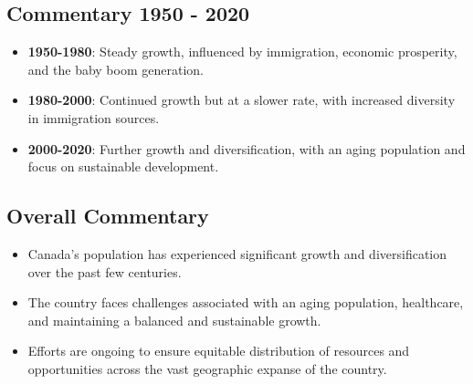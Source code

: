 \subsection*{Commentary 1950 - 2020}
\begin{itemize}
    \item \textbf{1950-1980}: Steady growth, influenced by immigration, economic prosperity, and the baby boom generation.
    \item \textbf{1980-2000}: Continued growth but at a slower rate, with increased diversity in immigration sources.
    \item \textbf{2000-2020}: Further growth and diversification, with an aging population and focus on sustainable development.
\end{itemize}

\subsection*{Overall Commentary}
\begin{itemize}
    \item Canada’s population has experienced significant growth and diversification over the past few centuries.
    \item The country faces challenges associated with an aging population, healthcare, and maintaining a balanced and sustainable growth.
    \item Efforts are ongoing to ensure equitable distribution of resources and opportunities across the vast geographic expanse of the country.
\end{itemize}
